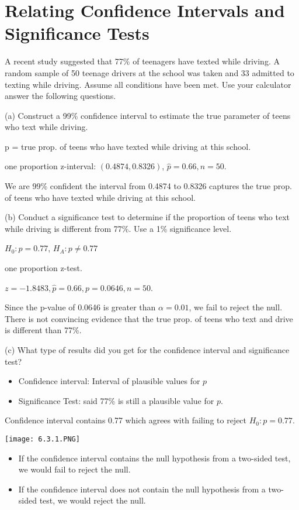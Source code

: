 \documentclass[../stats.tex]{subfiles}
\begin{document}
\section{Relating Confidence Intervals and Significance Tests}
\begin{example}
    A recent study suggested that 77\% of teenagers have texted while driving. A random sample of 50 teenage drivers at the school was taken and 33 admitted to texting while driving. Assume all conditions have been met. Use your calculator answer the following questions.

    (a) Construct a 99\% confidence interval to estimate the true parameter of teens who text while driving.

    p = true prop. of teens who have texted while driving at this school.

    one proportion z-interval: $(0.4874, 0.8326)$, $\hat{p}=0.66, n=50$.

    We are 99\% confident the interval from 0.4874 to 0.8326 captures the true prop. of teens who have texted while driving at this school.

    (b) Conduct a significance test to determine if the proportion of teens who text while driving is different from 77\%. Use a 1\% significance level.

    $H_0: p=0.77$, $H_A: p\neq 0.77$

    one proportion z-test.

    $z=-1.8483, \hat{p}=0.66, p=0.0646, n=50$.

    Since the p-value of 0.0646 is greater than $\alpha = 0.01$, we fail to reject the null. There is not convincing evidence that the true prop. of teens who text and drive is different than 77\%.

    (c) What type of results did you get for the confidence interval and significance test?

    \begin{itemize}
        \item Confidence interval: Interval of plausible values for $p$
        \item Significance Test: said 77\% is still a plausible value for $p$.
    \end{itemize}
    Confidence interval contains 0.77 which agrees with failing to reject $H_0: p=0.77$.
\end{example}

\begin{center}
    \texttt{[image: 6.3.1.PNG]}
\end{center}
\begin{itemize}
    \item If the confidence interval contains the null hypothesis from a two-sided test, we would fail to reject the null.
    \item If the confidence interval does not contain the null hypothesis from a two-sided test, we would reject the null.
\end{itemize}
\end{document}
